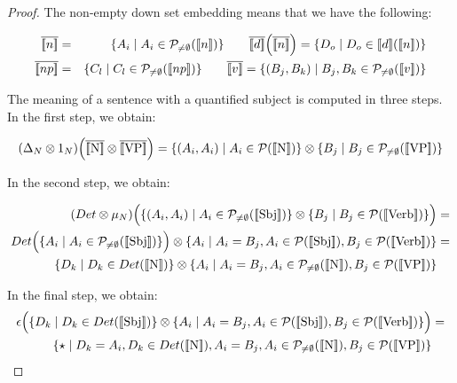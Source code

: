 \begin{proof}
The non-empty down set embedding means that we have the following: 

\begin{eqnarray*}
\overline{\semantics{{n}}} &=& \{A_i \mid A_i \in {\cal P}_{\neq \emptyset}(\semantics{{n}})\} \qquad 
\overline{\semantics{d}}\Big(\overline{\semantics{{n}}}\Big) = \{D_o \mid D_o \in {\semantics{d}}(\semantics{{n}})\}\\
\overline{\semantics{{np}}} &=& \{C_l \mid C_l \in {\cal P}_{\neq \emptyset}(\semantics{{np}})\} \qquad 
\overline{\semantics{{v}}} = \{(B_j, B_k) \mid B_j, B_k  \in {\cal P}_{\neq \emptyset}(\semantics{{v}})\}\\
\end{eqnarray*}

\noindent
The meaning of a sentence with a quantified subject is computed in three steps. In the  first step, we obtain:

\begin{align*}
(\Delta_N \otimes 1_{N})\Big(\overline{\semantics{\text{N}}} \otimes \overline{\semantics{\text{VP}}}\Big) =  \{(A_i, A_i) \mid A_i \in {\cal P} (\semantics{\text{N}})\} \otimes \{B_j \mid B_j \in  {\cal P}_{\neq \emptyset} (\semantics{\text{VP}})\}
\end{align*}


\noindent
In the second step, we obtain:

\begin{align*}
(Det \otimes  \mu_N)\Big(\{(A_i, A_i) \mid A_i \in {\cal P}_{\neq \emptyset} (\semantics{\text{Sbj}})\} \otimes \{B_j \mid B_j \in  {\cal P} (\semantics{\text{Verb}})\}\Big) &=\\
Det\Big(\{A_i \mid A_i \in {\cal P}_{\neq \emptyset} (\semantics{\text{Sbj}})\}\Big) \otimes \{A_i \mid A_i = B_j, A_i \in {\cal P} (\semantics{\text{Sbj}}), B_j \in  {\cal P}(\semantics{\text{Verb}})\} &=\\
\{D_k \mid D_k \in Det(\semantics{\text{N}})\} \otimes \{A_i \mid A_i = B_j, A_i \in {\cal P}_{\neq \emptyset} (\semantics{\text{N}}), B_j \in  {\cal P}(\semantics{\text{VP}})\}
\end{align*}

\noindent
In the final step, we obtain:
\begin{align*}
\epsilon\Big(\{D_k \mid D_k \in Det(\semantics{\text{Sbj}})\} \otimes \{A_i \mid A_i = B_j, A_i \in {\cal P} (\semantics{\text{Sbj}}), B_j \in  {\cal P}(\semantics{\text{Verb}})\}\Big) &=\\
 \{\star \mid  D_k = A_i, D_k \in Det(\semantics{\text{N}}), A_i = B_j, A_i \in {\cal P}_{\neq \emptyset} (\semantics{\text{N}}), B_j \in  {\cal P} (\semantics{\text{VP}})\}
\end{align*}
\end{proof}





